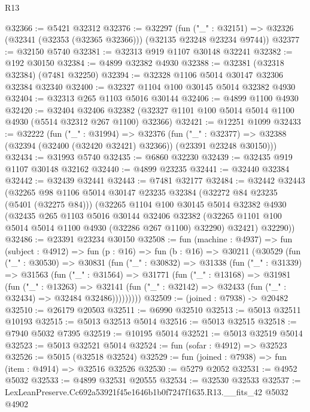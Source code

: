\begin{lexlean}{R13}
\begin{coremodule}
@32366 := @5421 @32312
@32376 := @32297
    (fun ("_" : @32151) => @32326 (@32341 (@32353 (@32365 @32366))) (@32135 @23248 @23234 @9744))
@32377 := @32150 @5740
@32381 := @32313 @919 @1107 @30148 @32241
@32382 := @192 @30150
@32384 := @4899 @32382 @4930
@32388 := @32381 (@32318 @32384) (@7481 @32250)
@32394 := @32328 @1106 @5014 @30147 @32306 @32384 @32340
@32400 := @32327 @1104 @100 @30145 @5014 @32382 @4930
@32404 := @32313 @265 @1103 @5016 @30144
@32406 := @4899 @1100 @4930
@32420 := @32404
    @32406
    @32382
    (@32327 @1101 @100 @5014 @5014 @1100 @4930 (@5514 @32312 @267 @1100) @32366)
@32421 := @12251 @1099
@32433 := @32222
    (fun ("_" : @31994) =>
    @32376
      (fun ("_" : @32377) =>
      @32388 (@32394 (@32400 (@32420 @32421) @32366)) (@23391 @23248 @30150)))
@32434 := @31993 @5740
@32435 := @6860 @32230
@32439 := @32435 @919 @1107 @30148 @32162
@32440 := @4899 @23235
@32441 := @32440 @32384
@32442 := @32439 @32441
@32443 := @7481 @32177
@32484 := @32442
    @32443
    (@32265
      @98
      @1106
      @5014
      @30147
      @23235
      @32384
      (@32272 @84 @23235 (@5401 (@32275 @84)))
      (@32265
        @1104
        @100
        @30145
        @5014
        @32382
        @4930
        (@32435
          @265
          @1103
          @5016
          @30144
          @32406
          @32382
          (@32265 @1101 @100 @5014 @5014 @1100 @4930 (@32286 @267 @1100) @32290)
          @32421)
        @32290))
@32486 := @23391 @23234 @30150
@32508 := fun (machine : @4937) =>
  fun (subject : @4912) =>
  fun (p : @16) =>
  fun (b : @16) =>
  @30211
    (@30529
      (fun ("_" : @30530) =>
      @30831
        (fun ("_" : @30832) =>
        @31338
          (fun ("_" : @31339) =>
          @31563
            (fun ("_" : @31564) =>
            @31771
              (fun ("_" : @13168) =>
              @31981
                (fun ("_" : @13263) =>
                @32141 (fun ("_" : @32142) => @32433 (fun ("_" : @32434) => @32484 @32486)))))))))
@32509 := (joined : @7938) -> @20482
@32510 := @26179 @20503
@32511 := @6990 @32510
@32513 := @5013 @32511 @10193
@32515 := @5013 @32513 @5014
@32516 := @5013 @32515
@32518 := @7940 @5032 @7395
@32519 := @10195 @5014
@32521 := @5013 @32519 @5014
@32523 := @5013 @32521 @5014
@32524 := fun (sofar : @4912) => @32523
@32526 := @5015 (@32518 @32524)
@32529 := fun (joined : @7938) => fun (item : @4914) => @32516 @32526
@32530 := @5279 @2052
@32531 := @4952 @5032
@32533 := @4899 @32531 @20555
@32534 := @32530 @32533
@32537 := LexLeanPreserve.Cc692a53921f45e1646b1b0f7247f1635.R13.__fits_42 @5032 @4902

\end{coremodule}
\end{lexlean}
